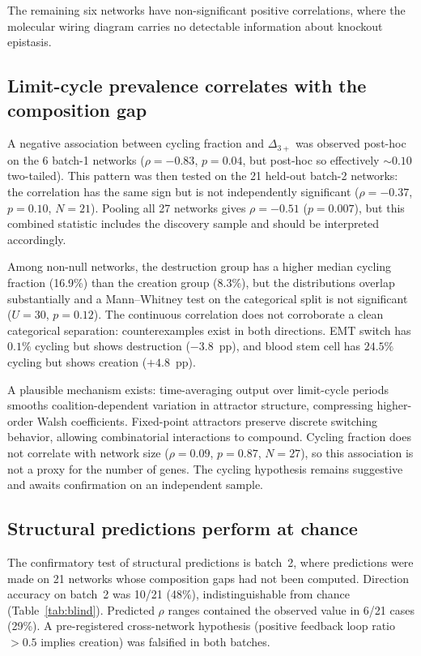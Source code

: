 \documentclass[11pt]{article}
\begin{document}
The remaining six networks have non-significant positive
correlations, where the molecular wiring diagram carries no detectable
information about knockout epistasis.


\subsection{Limit-cycle prevalence correlates with the composition gap}
\label{sec:cycling}

A negative association between cycling fraction and $\Delta_{3+}$ was
observed post-hoc on the 6 batch-1 networks ($\rho = -0.83$,
$p = 0.04$, but post-hoc so effectively $\sim 0.10$ two-tailed).
This pattern was then tested on the 21 held-out batch-2 networks:
the correlation has the same sign but is not independently
significant ($\rho = -0.37$, $p = 0.10$, $N = 21$). Pooling all 27
networks gives $\rho = -0.51$ ($p = 0.007$), but this combined
statistic includes the discovery sample and should be interpreted
accordingly.

Among non-null networks, the destruction group has a higher median
cycling fraction (16.9\%) than the creation group (8.3\%), but the
distributions overlap substantially and a Mann--Whitney test on the
categorical split is not significant ($U = 30$, $p = 0.12$). The
continuous correlation does not corroborate a clean categorical
separation: counterexamples exist in both directions. EMT switch has
$0.1\%$ cycling but shows destruction ($-3.8$~pp), and blood stem
cell has $24.5\%$ cycling but shows creation ($+4.8$~pp).

A plausible mechanism exists: time-averaging output over limit-cycle
periods smooths coalition-dependent variation in attractor structure,
compressing higher-order Walsh coefficients. Fixed-point attractors
preserve discrete switching behavior, allowing combinatorial
interactions to compound. Cycling fraction does not correlate with
network size ($\rho = 0.09$, $p = 0.87$, $N = 27$), so this
association is not a proxy for the number of genes. The cycling
hypothesis remains suggestive and awaits confirmation on an
independent sample.


\subsection{Structural predictions perform at chance}
\label{sec:blind-results}

The confirmatory test of structural predictions is batch~2, where
predictions were made on 21 networks whose composition gaps had not
been computed. Direction accuracy on batch~2 was 10/21 (48\%),
indistinguishable from chance (Table~\ref{tab:blind}). Predicted
$\rho$ ranges contained the observed value in 6/21 cases (29\%). A
pre-registered cross-network hypothesis (positive feedback loop ratio
$> 0.5$ implies creation) was falsified in both batches.
\end{document}
